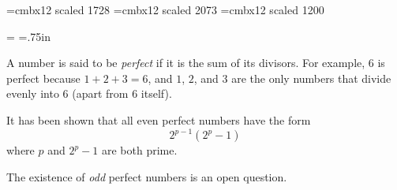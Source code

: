 \font\chapfont=cmbx12 scaled 1728
\font\titlefont=cmbx12 scaled 2073
\font\secfont=cmbx12 scaled 1200

\parskip=\baselineskip
\parindent=0pt
\hsize=5in
\hoffset=.75in

\vskip36pt

\vskip36pt

\vskip12pt

A number is said to be {\it perfect\/} if it
is the sum of its divisors.  For example, $6$ is
perfect because $1+2+3 = 6$, and $1$, $2$, and $3$
are the only numbers that divide evenly into $6$ 
(apart from $6$ itself).

It has been shown that all even perfect numbers
have the form $$2^{p-1}(2^{p}-1)$$ where $p$
and $2^{p}-1$ are both prime.

The existence of {\it odd\/} perfect numbers is 
an open question.
\bye
